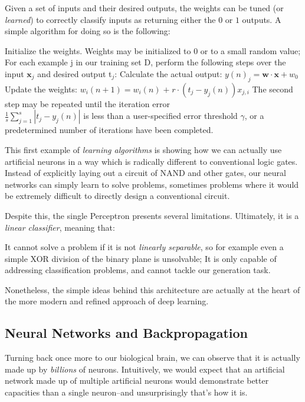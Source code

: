 Given a set of inputs and their desired outputs, the weights can be tuned (or \emph{learned}) to correctly classify inputs as returning either the $0$ or $1$ outputs. A simple algorithm for doing so is the following:

\begin{outline}[enumerate]
    \1 Initialize the weights. Weights may be initialized to $0$ or to a small random value;
    \1 For each example j in our training set D, perform the following steps over the input $\mathbf {x}_{j}$ and desired output t$_{j}$:
    \2 Calculate the actual output: $y(n)_j = \mathbf{w}\cdot\mathbf{x} + w_0 $
    \2 Update the weights:  $w_{i}(n+1)=w_{i}(n)\;{\boldsymbol {+}}\;r\cdot (t_{j}-y_{j}(n))x_{j,i}$
    \1 The second step may be repeated until the iteration error \\
    $\frac{1}{s} \sum_{j=1}^{s}|t_{j}-y_{j}(n)|$ is less than a user-specified error threshold $\gamma$, or a predetermined number of iterations have been completed.
\end{outline}

This first example of \emph{learning algorithms} is showing how we can actually use artificial neurons in a way which is radically different to conventional logic gates. Instead of explicitly laying out a circuit of NAND and other gates, our neural networks can simply learn to solve problems, sometimes problems where it would be extremely difficult to directly design a conventional circuit.

Despite this, the single Perceptron presents several limitations. Ultimately, it is a \emph{linear classifier}, meaning that:

\begin{outline}
    \1 It cannot solve a problem if it is not \emph{linearly separable}, so for example even a simple XOR division of the binary plane is unsolvable;
    \1 It is only capable of addressing classification problems, and cannot tackle our generation task.
\end{outline}

Nonetheless, the simple ideas behind this architecture are actually at the heart of the more modern and refined approach of deep learning.

\subsection{Neural Networks and Backpropagation}

Turning back once more to our biological brain, we can observe that it is actually made up by \emph{billions} of neurons. Intuitively, we would expect that an artificial network made up of multiple artificial neurons would demonstrate better capacities than a single neuron--and unsurprisingly that's how it is. 

